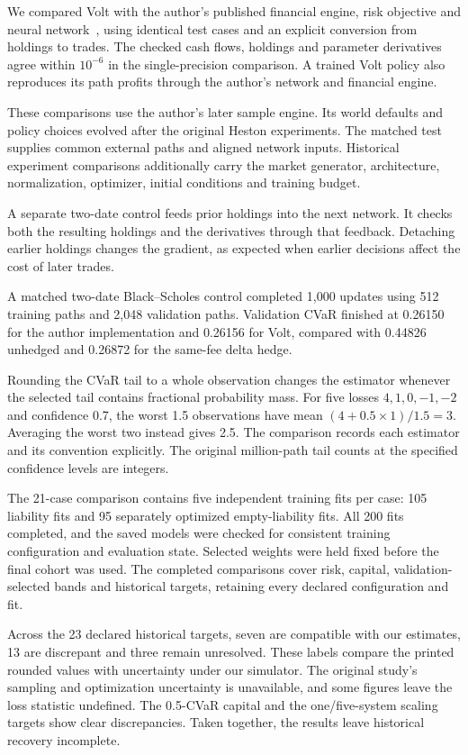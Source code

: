 \documentclass[8pt]{strategynet-journal}
\begin{document}
\begin{SNcolumns}
We compared Volt with the author's published financial engine, risk objective
and neural network~\cite{authorcode}, using identical test cases and an explicit
conversion from holdings to trades. The checked cash flows, holdings and parameter derivatives agree within
$10^{-6}$ in the single-precision comparison. A trained Volt policy also
reproduces its path profits through the author's network and financial engine.

These comparisons use the author's later sample engine. Its world defaults
and policy choices evolved after the original Heston experiments. The matched
test supplies common external paths and aligned network inputs. Historical
experiment comparisons additionally carry the market generator, architecture,
normalization, optimizer, initial conditions and training budget.

A separate two-date control feeds prior holdings into the next network.
It checks both the resulting holdings and the derivatives through that
feedback. Detaching earlier holdings changes the gradient, as expected when
earlier decisions affect the cost of later trades.

A matched two-date Black--Scholes control completed 1,000 updates using
512 training paths and 2,048 validation paths. Validation CVaR finished at
0.26150 for the author implementation and 0.26156 for Volt, compared with
0.44826 unhedged and 0.26872 for the same-fee delta hedge.

Rounding the CVaR tail to a whole observation changes the estimator whenever
the selected tail contains fractional probability mass. For five losses $4,1,0,-1,-2$ and confidence 0.7, the
worst 1.5 observations have mean $(4+0.5\times1)/1.5=3$. Averaging the worst
two instead gives 2.5. The comparison records each estimator and its convention explicitly. The original million-path tail
counts at the specified confidence levels are integers.

The 21-case comparison contains five independent training fits per case: 105 liability
fits and 95 separately optimized empty-liability fits. All 200 fits completed,
and the saved models were checked for consistent training configuration and
evaluation state. Selected weights were held fixed before the final cohort
was used. The completed comparisons cover risk, capital, validation-selected
bands and historical targets, retaining every declared configuration and fit.

Across the 23 declared historical targets, seven are compatible with our
estimates, 13 are discrepant and three remain unresolved. These labels compare
the printed rounded values with uncertainty under our simulator. The original
study's sampling and optimization uncertainty is unavailable, and some figures
leave the loss statistic undefined. The 0.5-CVaR capital and the one/five-system
scaling targets show clear discrepancies. Taken together, the results leave
historical recovery incomplete.


\end{SNcolumns}
\end{document}
